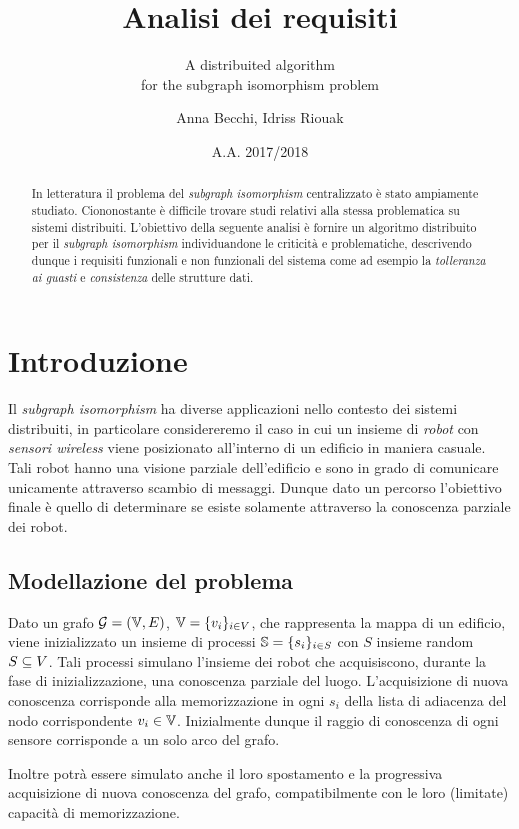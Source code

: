 \documentclass{llncs}
\subtitle{A distribuited algorithm\\for the subgraph isomorphism problem}
\title{Analisi dei requisiti}
\author{Anna Becchi, Idriss Riouak}
\institute{Laurea Magistrale in Informatica\\Universit\`a di Udine, Italy}
\date{A.A. 2017/2018}
\begin{document}
\maketitle
\begin{abstract}
In letteratura il problema del \emph{subgraph isomorphism}
centralizzato è stato ampiamente studiato. Ciononostante è difficile
trovare studi relativi alla stessa problematica su sistemi distribuiti.
L'obiettivo della seguente analisi è fornire un algoritmo distribuito
per il \emph{subgraph isomorphism} individuandone le criticità e
problematiche, descrivendo dunque i requisiti funzionali e non
funzionali del sistema come ad esempio la \emph{tolleranza ai
guasti} e \emph{consistenza} delle strutture dati. 
\end{abstract}

\section{Introduzione}
Il \emph{subgraph isomorphism} ha diverse applicazioni nello contesto
dei sistemi distribuiti, in particolare considereremo il caso in cui  un insieme
di \emph{robot} con \emph{sensori wireless} viene posizionato all'interno di
un edificio in maniera casuale. Tali robot hanno una visione parziale dell'edificio
e sono in grado di comunicare unicamente attraverso scambio di messaggi.
Dunque dato un percorso l'obiettivo finale è quello di determinare se esiste
solamente attraverso la conoscenza parziale dei robot.

\subsection{Modellazione del problema}
Dato un grafo $\mathcal{G} = ( \mathbb{V}, E)$, $\mathbb{V} = \{v_i\}_{i \in V}$,
che rappresenta la mappa di un edificio, viene inizializzato un
insieme di processi $\mathbb{S} = \{s_i \}_{i \in S}$ con $S$ insieme
random $S \subseteq V$.
Tali processi simulano l'insieme dei robot che
acquisiscono, durante la fase di inizializzazione, una conoscenza
parziale del luogo. L'acquisizione di nuova conoscenza corrisponde
alla memorizzazione in ogni $s_i$ della lista di adiacenza del nodo
corrispondente $v_i \in \mathbb{V}$.
Inizialmente dunque il raggio di conoscenza di ogni sensore corrisponde
a un solo arco del grafo.

Inoltre potrà essere simulato anche il loro spostamento e la progressiva
acquisizione di nuova conoscenza del grafo, compatibilmente con le
loro (limitate) capacità di memorizzazione.
\end{document}
